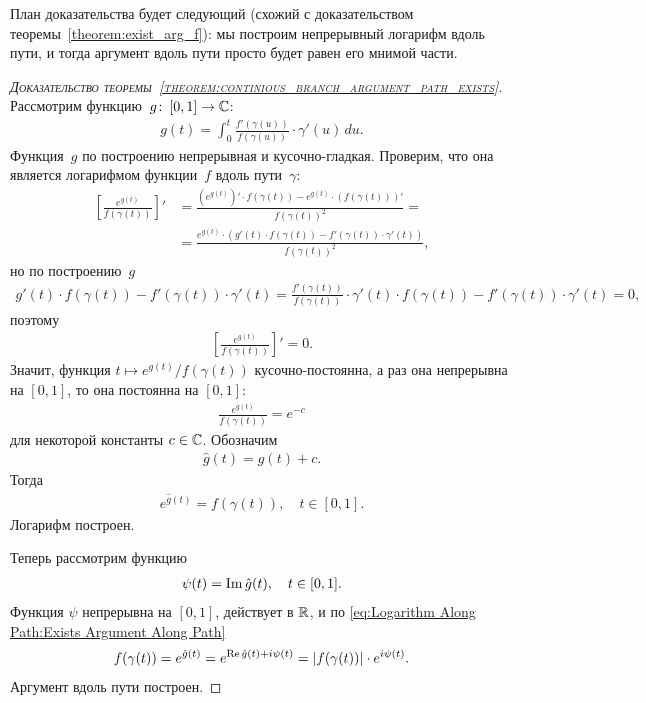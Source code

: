 \documentclass[../complex-analysis.tex]{subfiles}
\begin{document}
План доказательства будет следующий (схожий с доказательством теоремы~\ref{theorem:exist_arg_f}): мы построим непрерывный логарифм вдоль пути, и тогда аргумент вдоль пути просто будет равен его мнимой части.
\begin{proof}[\normalfont\textsc{Доказательство теоремы~\ref{theorem:continious_branch_argument_path_exists}}]
 Рассмотрим функцию~$ g \colon\,[0, 1] \to \mathbb{C} $:
 \begin{align}
  \label{eq:Explicit Def of Log Along Path}
  g(t) = \int_{0}^{t} \frac{f'(\gamma(u))}{f(\gamma(u))} \cdot  \gamma'(u)\,du.
 \end{align} Функция~$ g $ по построению непрерывная и кусочно-гладкая. Проверим, что она является логарифмом функции~$ f $ вдоль пути~$ \gamma $:
 \begin{align*}
  \left[ \frac{e^{g(t)}}{f(\gamma(t))} \right]' &= \frac{\left(e^{g(t)}\right)' \cdot f(\gamma(t)) - e^{g(t)} \cdot (f(\gamma(t)))'}{f(\gamma(t))^{2}} = \\
  &= \frac{e^{g(t)} \cdot \left( g'(t) \cdot f(\gamma(t)) - f'(\gamma(t)) \cdot \gamma'(t) \right)}{f(\gamma(t))^{2}},
 \end{align*} но по построению~$ g $
 \begin{align*}
  g'(t) \cdot f(\gamma(t)) - f'(\gamma(t)) \cdot \gamma'(t) = \frac{f'(\gamma(t))}{f(\gamma(t))} \cdot \gamma'(t) \cdot f(\gamma(t)) - f'(\gamma(t)) \cdot \gamma'(t) = 0,
 \end{align*} поэтому
 \begin{align*}
  \left[ \frac{e^{g(t)}}{f(\gamma(t))} \right]' = 0.
 \end{align*} Значит, функция $ t \mapsto e^{g(t)} / f(\gamma(t)) $ кусочно-постоянна, а раз она непрерывна на $ [0,1] $, то она постоянна на $ [0,1] $:
 \begin{align*}
  \frac{e^{g(t)}}{f(\gamma(t))} = e^{-c} 
 \end{align*} для некоторой константы $ c \in \mathbb{C} $. Обозначим
 \begin{align}
  \label{eq:Explicit Def Of True Log Along Path}
  \hat g (t) = g(t) + c.
 \end{align} Тогда
 \begin{align}
  \label{eq:Logarithm Along Path:Exists Argument Along Path}
  e^{\hat g(t)} = f(\gamma(t)), \quad t \in [0,1].
 \end{align} Логарифм построен.

 Теперь рассмотрим функцию
 \begin{align}
  \label{eq:Explicit Def of Argument Along Path}
  \psi(t) = \operatorname{Im} \hat g(t), \quad t \in [0,1].
 \end{align} Функция $ \psi $ непрерывна на $ [0,1] $, действует в $ \mathbb{R} $, и по \eqref{eq:Logarithm Along Path:Exists Argument Along Path}
 \begin{align*}
  f(\gamma(t)) = e^{\hat g(t)} = e^{\operatorname{Re} \hat g(t) + i \psi(t)} = \left| f(\gamma(t)) \right| \cdot e^{i\psi(t)}.
 \end{align*} Аргумент вдоль пути построен.
\end{proof}
\end{document}
